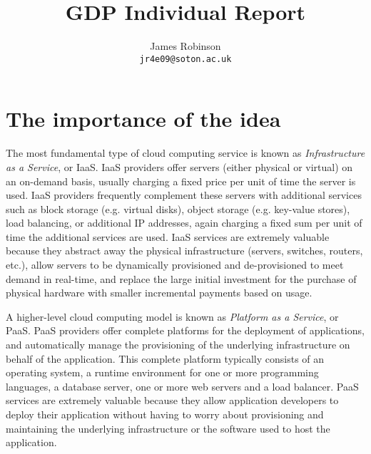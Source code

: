 \documentclass[a4paper]{proc}
\begin{document}
  \title{GDP Individual Report}
  \author{James Robinson\\\texttt{jr4e09@soton.ac.uk}}
  \maketitle

  \begin{abstract}
  \end{abstract}



  \section{The importance of the idea}


  The most fundamental type of cloud computing service is known as \emph{Infrastructure as a Service}, or IaaS. IaaS providers offer servers (either physical or virtual) on an on-demand basis, usually charging a fixed price per unit of time the server is used. IaaS providers frequently complement these servers with additional services such as block storage (e.g. virtual disks), object storage (e.g. key-value stores), load balancing, or additional IP addresses, again charging a fixed sum per unit of time the additional services are used. IaaS services are extremely valuable because they abstract away the physical infrastructure (servers, switches, routers, etc.), allow servers to be dynamically provisioned and de-provisioned to meet demand in real-time, and replace the large initial investment for the purchase of physical hardware with smaller incremental payments based on usage.

  A higher-level cloud computing model is known as \emph{Platform as a Service}, or PaaS. PaaS providers offer complete platforms for the deployment of applications, and automatically manage the provisioning of the underlying infrastructure on behalf of the application. This complete platform typically consists of an operating system, a runtime environment for one or more programming languages, a database server, one or more web servers and a load balancer. PaaS services are extremely valuable because they allow application developers to deploy their application without having to worry about provisioning and maintaining the underlying infrastructure or the software used to host the application.
\end{document}
